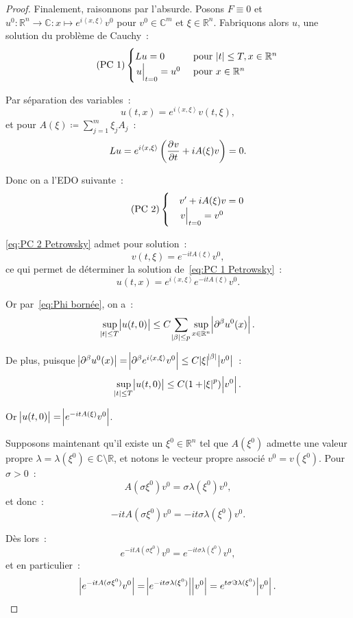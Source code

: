 \documentclass{report}
\newcommand{\C}{{\mathbb C}}
\newcommand{\R}{{\mathbb R}}
\newcommand{\scpr}[2]{\left\langle#1, #2\right\rangle}
\newcommand{\restr}[2]{\left.#1\vphantom{\big|}\right|_{#2}}
\theoremstyle{definition}
\theoremstyle{remark}
\begin{document}
\begin{proof}
Finalement, raisonnons par l'absurde. Posons $F \equiv 0$ et $u^0 : \R^n \to \C : x \mapsto e^{i\scpr x\xi}v^0$ pour $v^0 \in \C^m$ et $\xi \in \R^n$. Fabriquons alors $u$, une
solution du problème de Cauchy~:
\begin{equation}\label{eq:PC 1 Petrowsky}\tag{PC~1}
	\begin{cases}
		Lu = 0 &\text{ pour } \abs t \leq T, x \in \R^n \\
		\restr u{t=0} = u^0 &\text{ pour } x \in \R^n
	\end{cases}
\end{equation}

Par séparation des variables~:
\[u(t, x) = e^{i\scpr x\xi} v(t, \xi),\]
et pour $A(\xi) \coloneqq \sum_{j=1}^m\xi_jA_j$~:
\[Lu = e^{i\scpr x\xi}\left(\dpd vt + iA(\xi)v\right) = 0.\]

Donc on a l'EDO suivante~:
\begin{equation}\label{eq:PC 2 Petrowsky}\tag{PC~2}
	\begin{cases}
		&v' + iA(\xi)v = 0 \\
		&\restr v{t=0} = v^0
	\end{cases}
\end{equation}

\eqref{eq:PC 2 Petrowsky} admet pour solution~:
\[v(t, \xi) = e^{-itA(\xi)}v^0,\]
ce qui permet de déterminer la solution de~\eqref{eq:PC 1 Petrowsky}~:
\[u(t, x) = e^{i\scpr x\xi}e^{-itA(\xi)}v^0.\]

Or par~\eqref{eq:Phi bornée}, on a~:
\begin{equation}\label{eq:fin Petrowsky}
	\sup_{\abs t \leq T}\abs {u(t, 0)} \leq C\sum_{\abs \beta \leq p}\sup_{x \in \R^n}\abs {\partial^\beta u^0(x)}.
\end{equation}

De plus, puisque $\abs {\partial^\beta u^0(x)} = \abs {\partial^\beta e^{i\scpr x\xi}v^0} \leq C\abs \xi^{\abs \beta}\abs {v^0}$~:
\[\sup_{\abs t \leq T}\abs {u(t, 0)} \leq C(1+\abs \xi^p)\abs {v^0}.\]

Or $\abs {u(t, 0)} = \abs {e^{-itA(\xi)}v^0}$.

Supposons maintenant qu'il existe un $\xi^0 \in \R^n$ tel que $A(\xi^0)$ admette une valeur propre $\lambda = \lambda(\xi^0) \in \C \setminus \R$,
et notons le vecteur propre associé $v^0 = v(\xi^0)$. Pour $\sigma > 0$~:
\[A(\sigma\xi^0)v^0 = \sigma\lambda(\xi^0)v^0,\]
et donc~:
\[-itA(\sigma\xi^0)v^0 = -it\sigma\lambda(\xi^0)v^0.\]

Dès lors~:
\[e^{-itA(\sigma\xi^0)}v^0 = e^{-it\sigma\lambda(\xi^0)}v^0,\]
et en particulier~:
\[\abs {e^{-itA(\sigma\xi^0)}v^0} = \abs {e^{-it\sigma\lambda(\xi^0)}}\abs {v^0} = e^{t\sigma\Im\lambda(\xi^0)}\abs {v^0}.\]


\end{proof}
\end{document}
